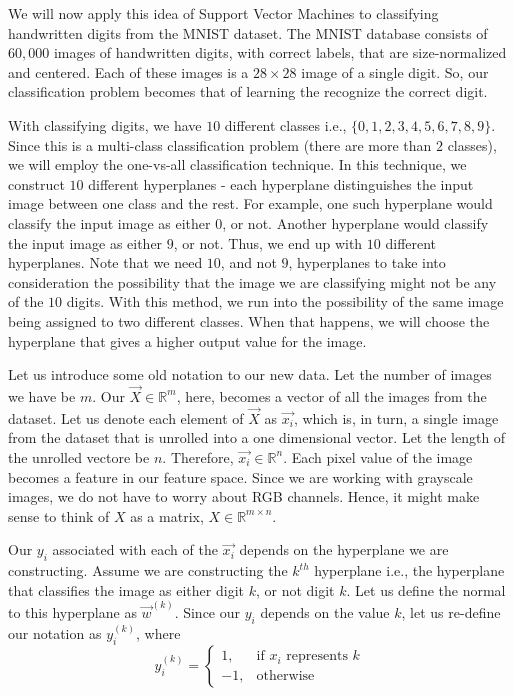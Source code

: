 
We will now apply this idea of Support Vector Machines to classifying handwritten digits from the MNIST dataset. The MNIST database consists of $60,000$ images of handwritten digits, with correct labels, that are size-normalized and centered. Each of these images is a $28\times28$ image of a single digit. So, our classification problem becomes that of learning the recognize the correct digit.

With classifying digits, we have $10$ different classes i.e., $\{0, 1, 2, 3, 4, 5, 6, 7, 8, 9\}$. Since this is a multi-class classification problem (there are more than $2$ classes), we will employ the one-vs-all classification technique. In this technique, we construct $10$ different hyperplanes - each hyperplane distinguishes the input image between one class and the rest. For example, one such hyperplane would classify the input image as either $0$, or not. Another hyperplane would classify the input image as either $9$, or not. Thus, we end up with $10$ different hyperplanes. Note that we need $10$, and not $9$, hyperplanes to take into consideration the possibility that the image we are classifying might not be any of the $10$ digits. With this method, we run into the possibility of the same image being assigned to two different classes. When that happens, we will choose the hyperplane that gives a higher output value for the image.

Let us introduce some old notation to our new data. Let the number of images we have be $m$. Our $\vec{X}\in\mathbb{R}^{m}$, here, becomes a vector of all the images from the dataset. Let us denote each element of $\vec{X}$ as $\vec{x_i}$, which is, in turn, a single image from the dataset that is unrolled into a one dimensional vector. Let the length of the unrolled vectore be $n$. Therefore, $\vec{x_i}\in\mathbb{R}^{n}$. Each pixel value of the image becomes a feature in our feature space. Since we are working with grayscale images, we do not have to worry about RGB channels. Hence, it might make sense to think of $X$ as a matrix, $X\in\mathbb{R}^{m \times n}$.

Our ${y_i}$ associated with each of the $\vec{x_i}$ depends on the hyperplane we are constructing. Assume we are constructing the $k^{th}$ hyperplane i.e., the hyperplane that classifies the image as either digit $k$, or not digit $k$. Let us define the normal to this hyperplane as $\vec{w}^{(k)}$. Since our $y_i$ depends on the value $k$, let us re-define our notation as $y^{(k)}_i$, where
\begin{equation}
    y^{(k)}_i= 
\begin{cases}
 1,& \text{if } x_i \text{ represents } k\\
-1,              & \text{otherwise}
\end{cases}
\end{equation}

